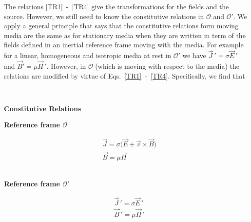 \documentclass[11pt,a4paper,oneside]{book}
\numberwithin{equation}{section}
\theoremstyle{it}
\theoremstyle{definition}
\begin{document}
The relations \ref{TR1}~-~\ref{TR4} give the transformations for the fields and 
the source. However, we still need to know the constitutive relations in 
$\mathcal{O}$ and $\mathcal{O'}$. We apply a general principle that says that 
the constitutive relations form moving media are the same as for stationary 
media when they are written in term of the fields defined in an inertial 
reference frame moving with the media. For example for a linear, homogeneous 
and isotropic media at rest in $\mathcal{O'}$ we have $\vec{J}\,' = 
\sigma\vec{E}\,'$ and $\vec{B}'=\mu\vec{H}\,'$. However, in $\mathcal{O}$ 
(which is moving with respect to the media) the relations are modified by 
virtue of Eqs.~\ref{TR1}~-~\ref{TR4}. Specifically, we find that
\begin{mybox}
	\setlength{\columnseprule}{1pt}
	\bigskip
	\ \newline \centerline{\textbf{Constitutive Relations}}
	\begin{multicols}{2}
		\centerline{\textbf{Reference frame $\mathcal{O}$}}	
		\begin{equation*}
			\begin{aligned}
				&\vec{J} =  \sigma\big(\vec{E}+\vec{v}\times\vec{B}\big) \\[8pt]
				&\vec{B} =  \mu\vec{H}
			\end{aligned}
		\end{equation*} 
		\ \newline
		\columnbreak
		\ \newline
		\centerline{\textbf{Reference frame $\mathcal{O'}$}}	
		\begin{equation}
			\begin{aligned}
				&\vec{J}\,' =  \sigma\vec{E}\,' \\[8pt]
				&\vec{B}\,' =  \mu\vec{H}\,'
			\end{aligned}
		\end{equation} 
		\ \newline
	\end{multicols}
\end{mybox}
\end{document}
